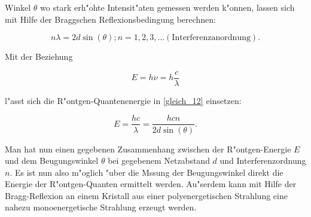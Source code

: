 	Winkel $\theta$ wo stark erh"ohte Intensit"aten gemessen werden k"onnen, lassen sich mit Hilfe der Braggschen Reflexionsbedingung berechnen:

	\begin{equation}
		n \lambda = 2 d \sin(\theta); n = 1,2,3,\ldots (\text{Interferenzanordnung}). \label{gleich_12}
	\end{equation}

	Mit der Beziehung

	\begin{equation}
		E = h \nu = h \frac{c}{\lambda}
	\end{equation}

	l"asst sich die R"ontgen-Quantenenergie in \ref{gleich_12} einsetzen:

	\begin{equation}
		E = \frac{hc}{\lambda} = \frac{hcn}{2d\sin(\theta)}. \label{gleich_13}
	\end{equation}

	Man hat nun einen gegebenen Zusammenhang zwischen der R"ontgen-Energie $E$ und dem Beugungswinkel $\theta$ bei gegebenem Netzabstand $d$ und Interferenzordnung $n$.
	Es ist nun also m"oglich "uber die Mssung der Beugungswinkel direkt die Energie der R"ontgen-Quanten ermittelt werden. 
	Au"serdem kann mit Hilfe der Bragg-Reflexion an einem Kristall aus einer polyenergetischen Strahlung eine nahezu monoenergetische Strahlung erzeugt werden.